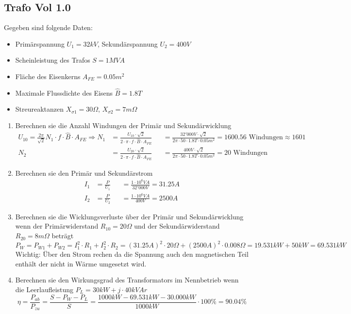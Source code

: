 \subsection{Trafo Vol 1.0}
Gegeben sind folgende Daten:
\begin{itemize}
\itemsep0em
\item Primärspannung $U_1 = 32kV$, Sekundärspannung $U_2 = 400V$
\item Scheinleistung des Trafos $S = 1MVA$
\item Fläche des Eisenkerns $A_{FE} = 0.05m^2$
\item Maximale Flussdichte des Eisens $\hat{B} = 1.8T$
\item Streureaktanzen $X_{\sigma 1} = 30\Omega$, $X_{\sigma 2} = 7m\Omega$ 
\end{itemize}
\begin{enumerate}
\item Berechnen sie die Anzahl Windungen der Primär und Sekundärwicklung
\begin{align*}
U_{10} = \frac{2\pi}{\sqrt{2}} N_1\cdot f\cdot \hat{B} \cdot A_{FE} \Rightarrow N_1&= \frac{U_{10}\cdot \sqrt{2}}{2\cdot \pi \cdot f\cdot \hat{B} \cdot A_{FE}} &&= \frac{32'000V\cdot \sqrt{2}}{2\pi\cdot 50\cdot 1.8T\cdot 0.05m^2}=1600.56 \textrm{ Windungen}\approx	1601\\
N_2 &= \frac{U_{20}\cdot \sqrt{2}}{2\cdot \pi\cdot f\cdot \hat{B}\cdot A_{FE}}&&=\frac{400V\cdot \sqrt{2}}{2\pi\cdot 50\cdot 1.8T\cdot 0.05m^2}=20 \textrm{ Windungen}
\end{align*}
	
\item Berechnen sie den Primär und Sekundärstrom
\begin{align*}
I_1&=\frac{P}{U_1} &&=\frac{1\cdot10^6VA}{32'000V} = 31.25A\\
I_2&=\frac{P}{U_2} &&=\frac{1\cdot10^6VA}{400V} = 2500A
\end{align*}

\item Berechnen sie die Wicklungsverluste über der Primär und Sekundärwicklung wenn der Primärwiderstand $R_{10} = 20\Omega$ und der Sekundärwiderstand $R_{20} = 8m\Omega$ beträgt
\[
	P_W = P_{W1} + P_{W2} = I_1^2\cdot R_1+I_2^2\cdot R_2 = (31.25A)^2\cdot 20\Omega +(2500A)^2\cdot 0.008\Omega = 19.531kW+50kW = 69.531kW
\]
Wichtig: Über den Strom rechen da die Spannung auch den magnetischen Teil enthält der nicht in Wärme umgesetzt wird.

\item Berechnen sie den Wirkungsgrad des Transformators im Nennbetrieb wenn die Leerlaufleistung $P_L = 30kW+j\cdot 40kVAr$
\[
	\eta = \frac{P_{ab}}{P_{zu}} = \frac{S-P_W-P_L}{S} = \frac{1000kW-69.531kW-30.000kW}{1000kW} \cdot 100\%= 90.04\% 
\]


\end{enumerate}
